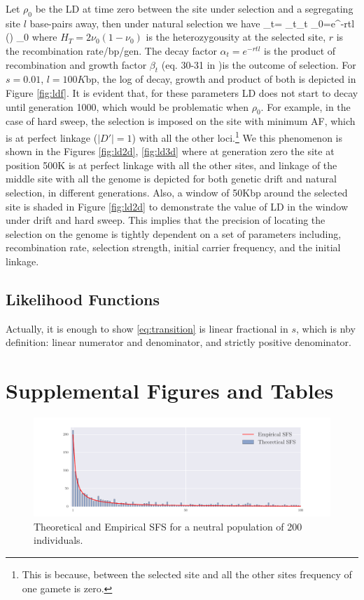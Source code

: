 \documentclass[11pt]{article}
\begin{document}
Let $\rho_0$ be the LD at time zero between the site under selection and a 
segregating site $l$ base-pairs away, then under natural selection we have
\beq
\rho_t= \alpha_t\beta_t \rho_0=e^{-rtl} \left(\right)  
\rho_0\label{eq:ldt}
\eeq
where $H_T=2\nu_0(1-\nu_0)$ is the heterozygousity at the selected site, $r$ is 
the recombination rate/bp/gen. The decay factor $\alpha_t=e^{-rtl}$ is the 
product of recombination and growth factor $\beta_t$ (eq. 30-31 in 
\cite{Stephan2006The})is the outcome of 
selection. For $s=0.01$, $l=100K$bp, the log of decay, growth and product of 
both is depicted in Figure \ref{fig:ldf}. It is evident that, for these 
parameters LD does not start to decay until generation 1000, which would be  
problematic when $\rho_0$. For example, in the case of hard sweep, the 
selection is imposed on the site with minimum AF, which is at perfect linkage 
($|D'|=1$) with all the other loci.\footnote{This is because, between the 
	selected site and all the other sites frequency of one gamete is zero.}
We this phenomenon is shown in the Figures \ref{fig:ld2d}, \ref{fig:ld3d} where 
at generation zero the site at position 500K is at perfect linkage with all the 
other sites, and linkage of the middle site with all the genome is depicted 
for both genetic drift and natural selection, in different generations.
Also, a window of 50Kbp around the selected site is shaded in Figure 
\ref{fig:ld2d} to demonstrate the value of LD in the window under drift and 
hard sweep. This implies that the precision of locating the selection on the 
genome is tightly dependent on a set of parameters including, recombination 
rate, selection strength, initial carrier frequency, and the initial linkage.
\subsection{Likelihood Functions} \label{app:likelihood}
Actually, it is enough to show \eqref{eq:transition} is
linear fractional in $s$, which is nby definition: linear numerator
and denominator, and strictly positive denominator.
\clearpage
\newpage

\section{Supplemental Figures and Tables}

\begin{figure}[H]
	\centering
	\includegraphics[trim=1in 0.1in 1in 0.1in,clip,width=\textwidth]{figures/sfs.pdf}
	\caption{Theoretical and Empirical SFS for a neutral population of 200 
	individuals.}	\label{fig:sfs}
\end{figure}
\end{document}
